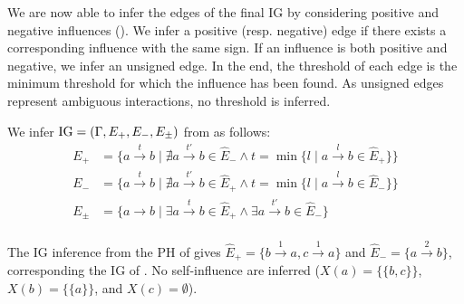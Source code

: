 We are now able to infer the edges of the final IG by considering positive and negative influences
().
We infer a positive (resp. negative) edge if there exists a corresponding influence with the same
sign. If an influence is both positive and negative, we infer an unsigned edge. In the end, the
threshold of each edge is the minimum threshold for which the influence has been found. As unsigned
edges represent ambiguous interactions, no threshold is inferred.
\begin{proposition}\label{pps:inference-IG}
We infer $\mathrm{IG} = (\Gamma,E_+,E_-,E_\pm)$ from  as follows:
\begin{align*}
E_+ &= \{a \xrightarrow{t} b \mid \nexists a \xrightarrow{t'} b \in \hat{E}_-
  \wedge t = \min \{ l \mid a \xrightarrow{l} b \in \hat{E}_+\}\} \\
E_- &= \{a \xrightarrow{t} b \mid \nexists a \xrightarrow{t'} b \in \hat{E}_+
  \wedge t = \min \{l \mid a \xrightarrow{l} b \in \hat{E}_-\}\} \\
E_\pm &= \{a \rightarrow b \mid \exists a \xrightarrow{t} b \in \hat{E}_+ \wedge \exists a \xrightarrow{t'} b \in \hat{E}_-\} \\
\end{align*}
\end{proposition}


\begin{example*}
The IG inference from the PH of  gives
$\hat{E}_+ = \{b \xrightarrow{1} a, c \xrightarrow{1} a\}$ and 
$\hat{E}_- = \{a \xrightarrow{2} b\}$, corresponding the IG of .
No self-influence are inferred ($X(a) = \{ \{b,c\} \}$, $X(b)=\{ \{a\}\}$, and $X(c)=\emptyset$).
\end{example*}
